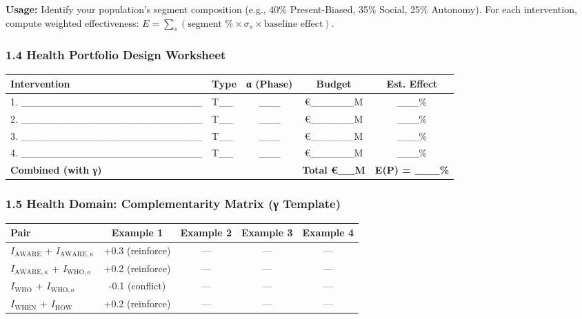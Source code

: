\textbf{Usage:} Identify your population's segment composition (e.g., 40\% Present-Biased, 35\% Social, 25\% Autonomy). For each intervention, compute weighted effectiveness: $E = \sum_s (\text{segment \%} \times \sigma_s \times \text{baseline effect})$.

\subsubsection*{1.4 Health Portfolio Design Worksheet}

\begin{center}
\begin{tabular}{@{}llccc@{}}
\toprule
\textbf{Intervention} & \textbf{Type} & \textbf{α (Phase)} & \textbf{Budget} & \textbf{Est. Effect} \\
\midrule
1. \_\_\_\_\_\_\_\_\_\_\_\_\_\_\_\_\_\_\_\_\_\_\_\_\_ & T\_\_ & \_\_\_ & €\_\_\_\_\_\_M & \_\_\_\% \\
2. \_\_\_\_\_\_\_\_\_\_\_\_\_\_\_\_\_\_\_\_\_\_\_\_\_ & T\_\_ & \_\_\_ & €\_\_\_\_\_\_M & \_\_\_\% \\
3. \_\_\_\_\_\_\_\_\_\_\_\_\_\_\_\_\_\_\_\_\_\_\_\_\_ & T\_\_ & \_\_\_ & €\_\_\_\_\_\_M & \_\_\_\% \\
4. \_\_\_\_\_\_\_\_\_\_\_\_\_\_\_\_\_\_\_\_\_\_\_\_\_ & T\_\_ & \_\_\_ & €\_\_\_\_\_\_M & \_\_\_\% \\
\midrule
\textbf{Combined (with γ)} & & & \textbf{Total €\_\_M} & \textbf{E(P) = \_\_\_\%} \\
\midrule
\end{tabular}
\end{center}

\subsubsection*{1.5 Health Domain: Complementarity Matrix (γ Template)}

\begin{center}
\begin{tabular}{@{}lcccc@{}}
\toprule
\textbf{Pair} & \textbf{Example 1} & \textbf{Example 2} & \textbf{Example 3} & \textbf{Example 4} \\
\midrule
$I_{\text{AWARE}}$ + $I_{\text{AWARE},\kappa}$ & +0.3 (reinforce) & --- & --- & --- \\
$I_{\text{AWARE},\kappa}$ + $I_{\text{WHO},o}$ & +0.2 (reinforce) & --- & --- & --- \\
$I_{\text{WHO}}$ + $I_{\text{WHO},o}$ & -0.1 (conflict) & --- & --- & --- \\
$I_{\text{WHEN}}$ + $I_{\text{HOW}}$ & +0.2 (reinforce) & --- & --- & --- \\
\midrule
\end{tabular}
\end{center}

